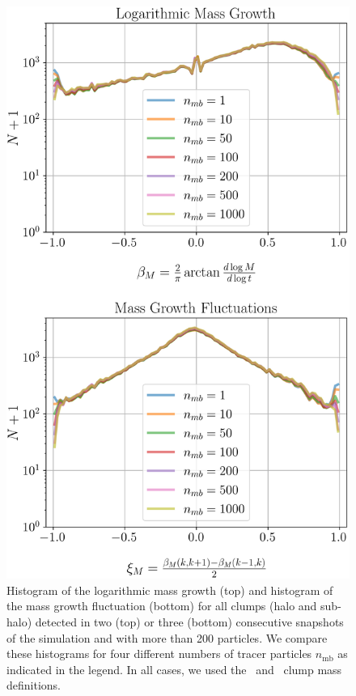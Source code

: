 \begin{figure}
  \centering
  \includegraphics[width=.6\linewidth, keepaspectratio]
	{figures/ACACIA/tree-statistics-my-threshold/mass-statistics-ntrace.png}%
  \caption{ Histogram of the logarithmic mass growth (top) and
    histogram of the mass growth fluctuation (bottom) for all clumps
    (halo and sub-halo) detected in two (top) or three (bottom)
    consecutive snapshots of the simulation and with more than 200
    particles.  We compare these histograms for four different numbers of
    tracer particles $n_{\mathrm{mb}}$ as indicated in the legend.  In all
    cases, we used the \exc\ and \sad\ clump mass definitions.
  }%
  \label{fig:ntracers_masses}
\end{figure}

